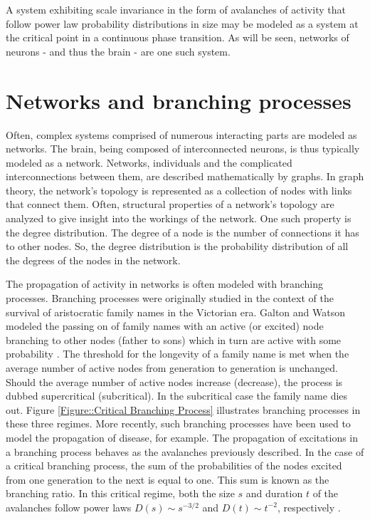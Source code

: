 \documentclass[12pt]{article}
\begin{document}
A system exhibiting scale invariance in the form of avalanches of activity that follow power law probability distributions in size may be modeled as a system at the critical point in a continuous phase transition. As will be seen, networks of neurons - and thus the brain - are one such system.

\section*{Networks and branching processes}

Often, complex systems comprised of numerous interacting parts are modeled as networks. The brain, being composed of interconnected neurons, is thus typically modeled as a network. Networks, individuals and the complicated interconnections between them, are described mathematically by graphs. In graph theory, the network's topology is represented as a collection of nodes with links that connect them. Often, structural properties of a network's topology are analyzed to give insight into the workings of the network. One such property is the degree distribution. The degree of a node is the number of connections it has to other nodes. So, the degree distribution is the probability distribution of all the degrees of the nodes in the network. 

The propagation of activity in networks is often modeled with branching processes. Branching processes were originally studied in the context of the survival of aristocratic family names in the Victorian era. Galton and Watson modeled the passing on of family names with an active (or excited) node branching to other nodes (father to sons) which in turn are active with some probability \cite{Watson2014}. The threshold for the longevity of a family name is met when the average number of active nodes from generation to generation is unchanged. Should the average number of active nodes increase (decrease), the process is dubbed supercritical (subcritical). In the subcritical case the family name dies out. Figure \ref{Figure::Critical Branching Process} illustrates branching processes in these three regimes. More recently, such branching processes have been used to model the propagation of disease, for example. The propagation of excitations in a branching process behaves as the avalanches previously described. In the case of a critical branching process, the sum of the probabilities of the nodes excited from one generation to the next is equal to one. This sum is known as the branching ratio. In this critical regime, both the size $s$ and duration $t$ of the avalanches follow power laws $ D(s) \sim s^{-3/2} $ and $ D(t) \sim t^{-2} $, respectively \cite{Larremore2014}.
\end{document}
